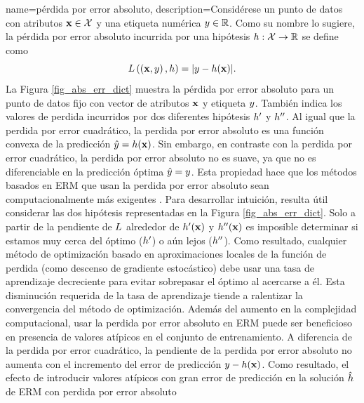 		{name={pérdida por error absoluto},
			description={Considérese un punto de datos con atributos ${\bf x} \in \mathcal{X}$ y una 
				etiqueta numérica $y \in \mathbb{R}$. Como su nombre lo sugiere, la pérdida 
				por error absoluto incurrida por una hipótesis $h: \mathcal{X} \rightarrow \mathbb{R}$ 
				se define como $$L\left(\left( {\bf x},y \right),h \right) = |y - h({\bf x})|.$$
				La Figura \ref{fig_abs_err_dict} muestra la pérdida por error absoluto para un punto de datos fijo 
				con vector de atributos ${\bf x}$ y etiqueta $y$. También indica los valores de perdida
				incurridos por dos diferentes hipótesis $h'$ y $h''$. Al igual que la perdida por error cuadrático, 
				la perdida por error absoluto es una función convexa de la predicción $\hat{y}=h({\bf x})$. 
				Sin embargo, en contraste con la perdida por error cuadrático, la perdida por error absoluto no es suave, ya que no es 
				diferenciable en la predicción óptima $\hat{y}=y$. Esta propiedad hace que los métodos 
				basados en ERM que usan la perdida por error absoluto sean computacionalmente más exigentes \cite{OptMLBook,nesterov04}. 
				Para desarrollar intuición, resulta útil considerar las dos hipótesis representadas en la Figura \ref{fig_abs_err_dict}. 
				Solo a partir de la pendiente de $L$ alrededor de $h'({\bf x})$ y $h''({\bf x})$ 
				es imposible determinar si estamos muy cerca del óptimo ($h'$) o aún lejos ($h''$). 
				Como resultado, cualquier método de optimización basado en aproximaciones locales de la función de perdida (como descenso de gradiente estocástico) 
				debe usar una tasa de aprendizaje decreciente para evitar sobrepasar el óptimo al acercarse a él. Esta disminución requerida 
				de la tasa de aprendizaje tiende a ralentizar la convergencia del método de optimización. Además del aumento en la complejidad computacional, 
				usar la perdida por error absoluto en ERM puede ser beneficioso en presencia de valores atípicos en el conjunto de entrenamiento. 
				A diferencia de la perdida por error cuadrático, la pendiente de la perdida por error absoluto no aumenta con el incremento del error 
				de predicción $y - h({\bf x})$. Como resultado, el efecto de introducir valores atípicos con 
				gran error de predicción en la solución $\hat{h}$ de ERM con perdida por error absoluto 
}}
